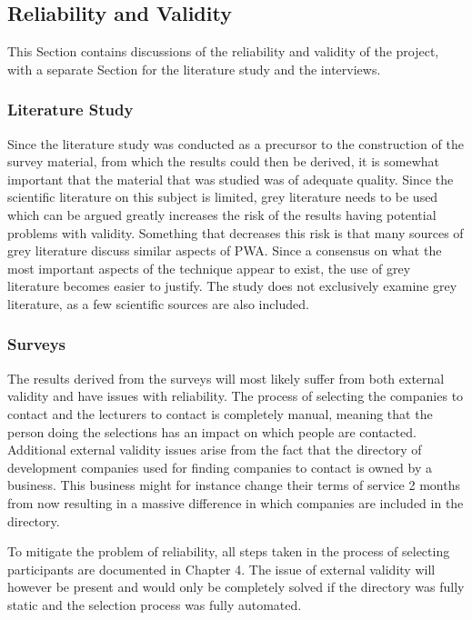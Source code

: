\documentclass[a4paper,12pt]{article}
\begin{document}
\subsection{Reliability and Validity}
This Section contains discussions of the reliability and validity of the project, with a separate Section for the literature study and the interviews.

\subsubsection{Literature Study}
Since the literature study was conducted as a precursor to the construction of the survey material, from which the results could then be derived, it is somewhat important that the material that was studied was of adequate quality. Since the scientific literature on this subject is limited, grey literature needs to be used which can be argued greatly increases the risk of the results having potential problems with validity. Something that decreases this risk is that many sources of grey literature discuss similar aspects of PWA. Since a consensus on what the most important aspects of the technique appear to exist, the use of grey literature becomes easier to justify. The study does not exclusively examine grey literature, as a few scientific sources are also included.

\subsubsection{Surveys}
The results derived from the surveys will most likely suffer from both external validity and have issues with reliability. The process of selecting the companies to contact and the lecturers to contact is completely manual, meaning that the person doing the selections has an impact on which people are contacted. Additional external validity issues arise from the fact that the directory of development companies used for finding companies to contact is owned by a business. This business might for instance change their terms of service 2 months from now resulting in a massive difference in which companies are included in the directory. 

To mitigate the problem of reliability, all steps taken in the process of selecting participants are documented in Chapter 4. The issue of external validity will however be present and would only be completely solved if the directory was fully static and the selection process was fully automated. 
\end{document}
